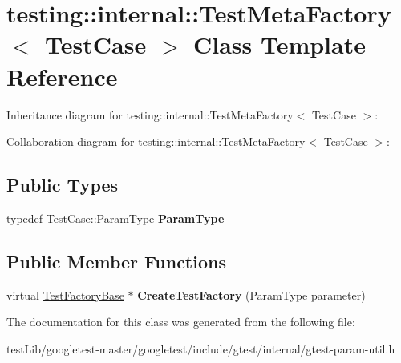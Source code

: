 \hypertarget{classtesting_1_1internal_1_1TestMetaFactory}{}\section{testing\+:\+:internal\+:\+:Test\+Meta\+Factory$<$ Test\+Case $>$ Class Template Reference}
\label{classtesting_1_1internal_1_1TestMetaFactory}


Inheritance diagram for testing\+:\+:internal\+:\+:Test\+Meta\+Factory$<$ Test\+Case $>$\+:


Collaboration diagram for testing\+:\+:internal\+:\+:Test\+Meta\+Factory$<$ Test\+Case $>$\+:
\subsection*{Public Types}
\begin{DoxyCompactItemize}
\item 
\mbox{\label{classtesting_1_1internal_1_1TestMetaFactory_a9c12e442b4389381b948ed669fcf0f84}} 
typedef Test\+Case\+::\+Param\+Type {\bfseries Param\+Type}
\end{DoxyCompactItemize}
\subsection*{Public Member Functions}
\begin{DoxyCompactItemize}
\item 
\mbox{\label{classtesting_1_1internal_1_1TestMetaFactory_ae9f5334c68af309bca8f7ec29d837e38}} 
virtual \hyperlink{classtesting_1_1internal_1_1TestFactoryBase}{Test\+Factory\+Base} $\ast$ {\bfseries Create\+Test\+Factory} (Param\+Type parameter)
\end{DoxyCompactItemize}


The documentation for this class was generated from the following file\+:\begin{DoxyCompactItemize}
\item 
test\+Lib/googletest-\/master/googletest/include/gtest/internal/gtest-\/param-\/util.\+h\end{DoxyCompactItemize}
